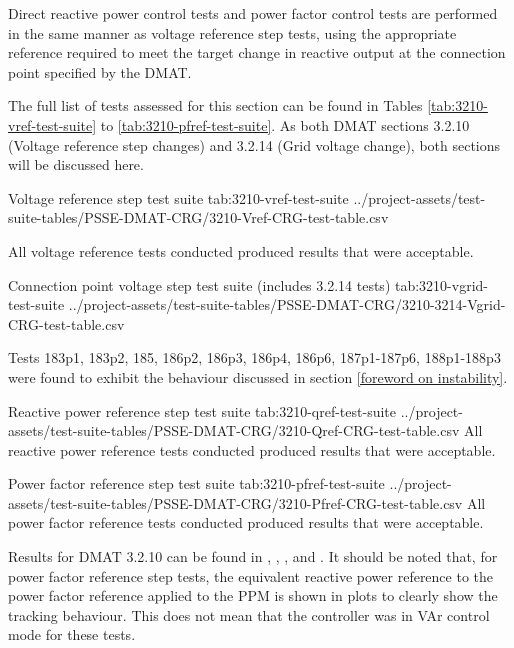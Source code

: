 \documentclass{../grid-link-report}
\newcommand{\projectassetsdir}{../project-assets}
\begin{document}
	Direct reactive power control tests and power factor control tests are performed in the same manner as voltage reference step tests, using the appropriate reference required to meet the target change in reactive output at the connection point specified by the \ac{DMAT}.
	
	The full list of tests assessed for this section can be found in Tables \ref{tab:3210-vref-test-suite} to \ref{tab:3210-pfref-test-suite}. As both DMAT sections 3.2.10 (Voltage reference step changes) and 3.2.14 (Grid voltage change), both sections will be discussed here.
	
	{
		\fontsize{7}{9}\selectfont
		\autoscaledlongtable
		{Voltage reference step test suite}
		{tab:3210-vref-test-suite}
		{\projectassetsdir/test-suite-tables/PSSE-DMAT-CRG/3210-Vref-CRG-test-table.csv}
	}
	
	All voltage reference tests conducted produced results that were acceptable.
	
	{
		\fontsize{7}{9}\selectfont
		\autoscaledlongtable
		{Connection point voltage step test suite (includes 3.2.14 tests)}
		{tab:3210-vgrid-test-suite}
		{\projectassetsdir/test-suite-tables/PSSE-DMAT-CRG/3210-3214-Vgrid-CRG-test-table.csv}
	}
	
	Tests 183p1, 183p2, 185, 186p2, 186p3, 186p4, 186p6, 187p1-187p6, 188p1-188p3 were found to exhibit the behaviour discussed in section \ref{foreword on instability}.
	
	
	{
		\fontsize{7}{9}\selectfont
		\autoscaledlongtable
		{Reactive power reference step test suite}
		{tab:3210-qref-test-suite}
		{\projectassetsdir/test-suite-tables/PSSE-DMAT-CRG/3210-Qref-CRG-test-table.csv}
	}
	All reactive power reference tests conducted produced results that were acceptable.
	
	{
		\fontsize{7}{9}\selectfont
		\autoscaledlongtable
		{Power factor reference step test suite}
		{tab:3210-pfref-test-suite}
		{\projectassetsdir/test-suite-tables/PSSE-DMAT-CRG/3210-Pfref-CRG-test-table.csv}
	}
	All power factor reference tests conducted produced results that were acceptable.
	
	Results for DMAT 3.2.10 can be found in , , , and . It should be noted that, for power factor reference step tests, the equivalent reactive power reference to the power factor reference applied to the \ac{PPM} is shown in plots to clearly show the tracking behaviour. This does not mean that the controller was in VAr control mode for these tests.
	
\end{document}
